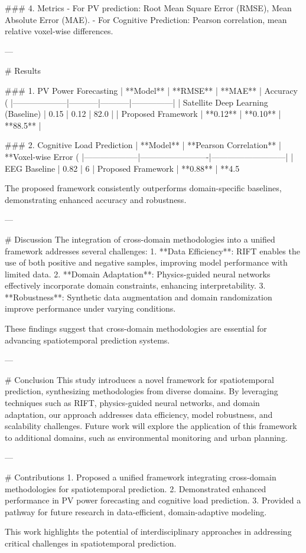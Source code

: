 ### 4. Metrics  
- For PV prediction: Root Mean Square Error (RMSE), Mean Absolute Error (MAE).  
- For Cognitive Prediction: Pearson correlation, mean relative voxel-wise differences.  

---

# Results  

### 1. PV Power Forecasting  
| **Model**         | **RMSE**  | **MAE**   | Accuracy (%
|--------------------|-----------|-----------|---------------|  
| Satellite Deep Learning (Baseline) | 0.15      | 0.12      | 82.0          |  
| Proposed Framework | **0.12**  | **0.10**  | **88.5**      |  

### 2. Cognitive Load Prediction  
| **Model**         | **Pearson Correlation** | **Voxel-wise Error (%
|--------------------|-------------------------|---------------------------|  
| EEG Baseline       | 0.82                   | 6%
| Proposed Framework | **0.88**               | **4.5%

The proposed framework consistently outperforms domain-specific baselines, demonstrating enhanced accuracy and robustness.  

---

# Discussion  
The integration of cross-domain methodologies into a unified framework addresses several challenges:  
1. **Data Efficiency**: RIFT enables the use of both positive and negative samples, improving model performance with limited data.  
2. **Domain Adaptation**: Physics-guided neural networks effectively incorporate domain constraints, enhancing interpretability.  
3. **Robustness**: Synthetic data augmentation and domain randomization improve performance under varying conditions.  

These findings suggest that cross-domain methodologies are essential for advancing spatiotemporal prediction systems.  

---

# Conclusion  
This study introduces a novel framework for spatiotemporal prediction, synthesizing methodologies from diverse domains. By leveraging techniques such as RIFT, physics-guided neural networks, and domain adaptation, our approach addresses data efficiency, model robustness, and scalability challenges. Future work will explore the application of this framework to additional domains, such as environmental monitoring and urban planning.  

---

# Contributions  
1. Proposed a unified framework integrating cross-domain methodologies for spatiotemporal prediction.  
2. Demonstrated enhanced performance in PV power forecasting and cognitive load prediction.  
3. Provided a pathway for future research in data-efficient, domain-adaptive modeling.  

This work highlights the potential of interdisciplinary approaches in addressing critical challenges in spatiotemporal prediction.  